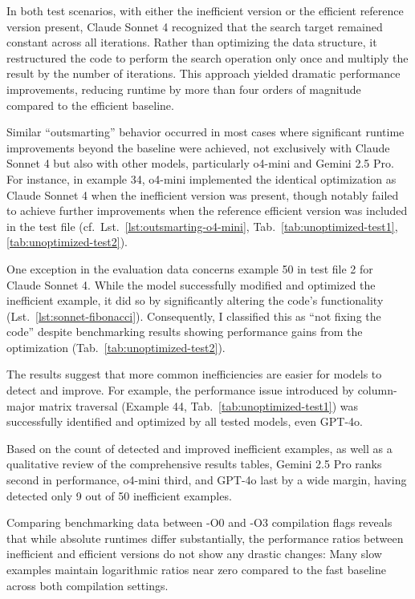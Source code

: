 In both test scenarios, with either the inefficient version or the efficient reference version present, Claude Sonnet 4 recognized that the search target remained constant across all iterations.
Rather than optimizing the data structure, it restructured the code to perform the search operation only once and multiply the result by the number of iterations.
This approach yielded dramatic performance improvements, reducing runtime by more than four orders of magnitude compared to the efficient baseline.

Similar \enquote{outsmarting} behavior occurred in most cases where significant runtime improvements beyond the baseline were achieved, not exclusively with Claude Sonnet 4 but also with other models, particularly o4-mini and Gemini 2.5 Pro.
For instance, in example 34, o4-mini implemented the identical optimization as Claude Sonnet 4 when the inefficient version was present, though notably failed to achieve further improvements when the reference efficient version was included in the test file (cf.\ Lst.\ \ref{lst:outsmarting-o4-mini}, Tab.\ \ref{tab:unoptimized-test1}, \ref{tab:unoptimized-test2}).

\vspace{\baselineskip}
One exception in the evaluation data concerns example 50 in test file 2 for Claude Sonnet 4.
While the model successfully modified and optimized the inefficient example, it did so by significantly altering the code's functionality (Lst.\ \ref{lst:sonnet-fibonacci}).
Consequently, I classified this as \enquote{not fixing the code} despite benchmarking results showing performance gains from the optimization (Tab.\ \ref{tab:unoptimized-test2}).

\vspace{\baselineskip}
The results suggest that more common inefficiencies are easier for models to detect and improve.
For example, the performance issue introduced by column-major matrix traversal (Example 44, Tab.\ \ref{tab:unoptimized-test1}) was successfully identified and optimized by all tested models, even GPT-4o.

\vspace{\baselineskip}
Based on the count of detected and improved inefficient examples, as well as a qualitative review of the comprehensive results tables, Gemini 2.5 Pro ranks second in performance, o4-mini third, and GPT-4o last by a wide margin, having detected only 9 out of 50 inefficient examples.

\vspace{\baselineskip}
Comparing benchmarking data between -O0 and -O3 compilation flags reveals that while absolute runtimes differ substantially, the performance ratios between inefficient and efficient versions do not show any drastic changes: 
Many slow examples maintain logarithmic ratios near zero compared to the fast baseline across both compilation settings.

